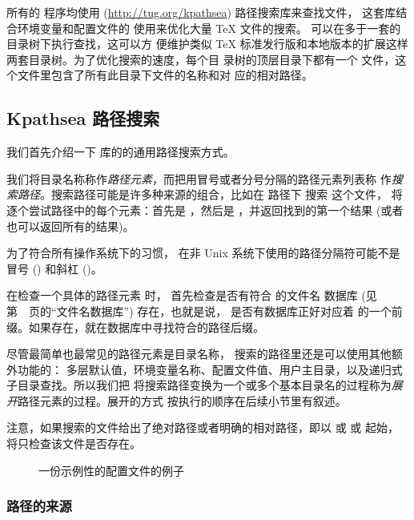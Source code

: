 \documentclass{article}
\begin{document}
所有的 \Webc{} 程序均使用 \KPS{} (\url{http://tug.org/kpathsea}) 路径搜索库来查找文件，
这套库结合环境变量和配置文件的
使用来优化大量 \TeX{} 文件的搜索。\Webc{} 可以在多于一套的目录树下执行查找，这可以方
便维护类似 \TeX{} 标准发行版和本地版本的扩展这样两套目录树。为了优化搜索的速度，每个目
录树的顶层目录下都有一个  文件，这个文件里包含了所有此目录下文件的名称和对
应的相对路径。

\subsection{Kpathsea 路径搜索}
\label{sec:kpathsea}

我们首先介绍一下 \KPS{} 库的的通用路径搜索方式。

我们将目录名称称作\emph{路径元素}，而把用冒号或者分号分隔的路径元素列表称
作\emph{搜索路径}。搜索路径可能是许多种来源的组合，比如在  路径下
搜索  这个文件，\KPS{} 将逐个尝试路径中的每个元素：首先是
，然后是 ，并返回找到的第一个结果 (或者
也可以返回所有的结果)。

为了符合所有操作系统下的习惯，\KPS{} 在非 Unix 系统下使用的路径分隔符可能不是冒号
(\samp{:}) 和斜杠 (\samp{/})。

在检查一个具体的路径元素  时，\KPS{} 首先检查是否有符合  的文件名
数据库 (见第~\pageref{sec:filename-database}~页的``文件名数据库'') 存在，也就是说，
是否有数据库正好对应着  的一个前缀。如果存在，就在数据库中寻找符合的路径后缀。

尽管最简单也最常见的路径元素是目录名称，\KPS{} 搜索的路径里还是可以使用其他额外功能的：
多层默认值，环境变量名称、配置文件值、用户主目录，以及递归式子目录查找。所以我们把 \KPS{}
将搜索路径变换为一个或多个基本目录名的过程称为\emph{展开}路径元素的过程。展开的方式
按执行的顺序在后续小节里有叙述。

注意，如果搜索的文件给出了绝对路径或者明确的相对路径，即以 \samp{/} 或  或
 起始，\KPS{} 将只检查该文件是否存在。

\ifSingleColumn
\else
\begin{figure*}

\setlength{\abovecaptionskip}{0pt}
  \caption{一份示例性的配置文件的例子}
  \label{fig:config-sample}
\end{figure*}
\fi

\subsubsection{路径的来源}
\label{sec:path-sources}
\end{document}

